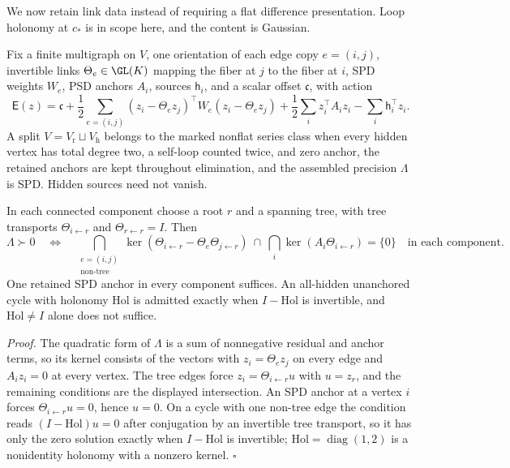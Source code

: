We now retain link data instead of requiring a flat difference presentation.
Loop holonomy at \(c_*\) is in scope here, and the content is Gaussian.

Fix a finite multigraph on \(V\), one orientation of each edge copy
\(e=(i,j)\), invertible links \(\Theta_e\in\GL(K)\) mapping the fiber at \(j\) to
the fiber at \(i\), SPD weights \(W_e\), PSD anchors \(A_i\), sources
\(\mathsf h_i\), and a scalar offset \(\mathfrak c\), with action
\begin{equation}
\mathsf E(z)=\mathfrak c
+\frac12\sum_{e=(i,j)}
(z_i-\Theta_ez_j)^\top W_e(z_i-\Theta_ez_j)
+\frac12\sum_i z_i^\top A_i z_i-\sum_i \mathsf h_i^\top z_i .
\label{eq:cg-nonflat-series-action}
\end{equation}
A split \(V=V_{\mathrm r}\sqcup V_{\mathrm h}\) belongs to the marked nonflat
series class when every hidden vertex has total degree two, a self-loop counted
twice, and zero anchor, the retained anchors are kept throughout elimination,
and the assembled precision \(\Lambda\) is SPD. Hidden sources need not vanish.

In each connected component choose a root \(r\) and a spanning tree, with tree
transports \(\Theta_{i\leftarrow r}\) and \(\Theta_{r\leftarrow r}=I\). Then
\begin{equation}
\Lambda\succ0
\quad\Longleftrightarrow\quad
\bigcap_{\substack{e=(i,j)\\\text{non-tree}}}
\ker(\Theta_{i\leftarrow r}-\Theta_e\Theta_{j\leftarrow r})
\ \cap\ \bigcap_i\ker(A_i\Theta_{i\leftarrow r})=\{0\}
\quad\text{in each component}.
\label{eq:cg-nonflat-series-properness}
\end{equation}
One retained SPD anchor in every component suffices. An all-hidden unanchored
cycle with holonomy \(\mathrm{Hol}\) is admitted exactly when \(I-\mathrm{Hol}\)
is invertible, and \(\mathrm{Hol}\neq I\) alone does not suffice.

\noindent\emph{Proof.}
The quadratic form of \(\Lambda\) is a sum of nonnegative residual and anchor
terms, so its kernel consists of the vectors with \(z_i=\Theta_ez_j\) on every
edge and \(A_iz_i=0\) at every vertex. The tree edges force
\(z_i=\Theta_{i\leftarrow r}u\) with \(u=z_r\), and the remaining conditions are
the displayed intersection. An SPD anchor at a vertex \(i\) forces
\(\Theta_{i\leftarrow r}u=0\), hence \(u=0\). On a cycle with one non-tree edge
the condition reads \((I-\mathrm{Hol})u=0\) after conjugation by an invertible
tree transport, so it has only the zero solution exactly when \(I-\mathrm{Hol}\)
is invertible; \(\mathrm{Hol}=\operatorname{diag}(1,2)\) is a nonidentity
holonomy with a nonzero kernel. \(\square\)

